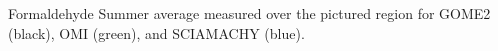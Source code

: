 \label{fig:intercomparehcho}
Formaldehyde Summer average measured over the pictured region for GOME2 (black), OMI (green), and SCIAMACHY (blue).
